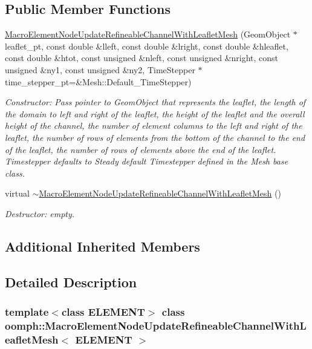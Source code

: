 \subsection*{Public Member Functions}
\begin{DoxyCompactItemize}
\item 
\hyperlink{classoomph_1_1MacroElementNodeUpdateRefineableChannelWithLeafletMesh_aa15c165d7e755e4e885d895e16bb76b8}{Macro\+Element\+Node\+Update\+Refineable\+Channel\+With\+Leaflet\+Mesh} (Geom\+Object $\ast$leaflet\+\_\+pt, const double \&lleft, const double \&lright, const double \&hleaflet, const double \&htot, const unsigned \&nleft, const unsigned \&nright, const unsigned \&ny1, const unsigned \&ny2, Time\+Stepper $\ast$time\+\_\+stepper\+\_\+pt=\&Mesh\+::\+Default\+\_\+\+Time\+Stepper)
\begin{DoxyCompactList}\small\item\em Constructor\+: Pass pointer to Geom\+Object that represents the leaflet, the length of the domain to left and right of the leaflet, the height of the leaflet and the overall height of the channel, the number of element columns to the left and right of the leaflet, the number of rows of elements from the bottom of the channel to the end of the leaflet, the number of rows of elements above the end of the leaflet. Timestepper defaults to Steady default Timestepper defined in the Mesh base class. \end{DoxyCompactList}\item 
virtual \hyperlink{classoomph_1_1MacroElementNodeUpdateRefineableChannelWithLeafletMesh_af22b4288c7db553beb8658c29eb2cdaf}{$\sim$\+Macro\+Element\+Node\+Update\+Refineable\+Channel\+With\+Leaflet\+Mesh} ()
\begin{DoxyCompactList}\small\item\em Destructor\+: empty. \end{DoxyCompactList}\end{DoxyCompactItemize}
\subsection*{Additional Inherited Members}


\subsection{Detailed Description}
\subsubsection*{template$<$class E\+L\+E\+M\+E\+NT$>$\newline
class oomph\+::\+Macro\+Element\+Node\+Update\+Refineable\+Channel\+With\+Leaflet\+Mesh$<$ E\+L\+E\+M\+E\+N\+T $>$}

